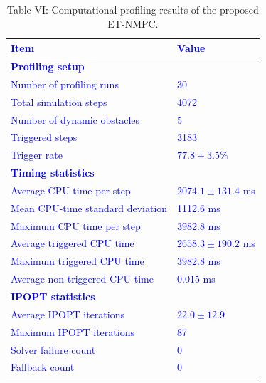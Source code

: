 \documentclass[12pt, twosides]{article}
\theoremstyle{definition}
\begin{document}
 \begin{table}[h]
 	\centering
 	\captionsetup{labelformat=empty}
 	\caption{Table VI: Computational profiling results of the proposed ET-NMPC.}
 	\label{tab:computational_profiling}
 	\scriptsize
 	\setlength{\tabcolsep}{2.5pt}
 	\renewcommand{\arraystretch}{1.12}
 	\begin{tabular}{p{}p{}}
 		\toprule
 		\textbf{\textcolor{blue}{Item}} & \textbf{\textcolor{blue}{Value}} \\
 		\midrule
 		\multicolumn{2}{l}{\textbf{\textcolor{blue}{Profiling setup}}} \\
 		\textcolor{blue}{Number of profiling runs} & \textcolor{blue}{30} \\
 		\textcolor{blue}{Total simulation steps} & \textcolor{blue}{4072} \\
 		\textcolor{blue}{Number of dynamic obstacles} & \textcolor{blue}{5} \\
 		\textcolor{blue}{Triggered steps} & \textcolor{blue}{3183} \\
 		\textcolor{blue}{Trigger rate} & \textcolor{blue}{$77.8 \pm 3.5\%$} \\
 		\midrule
 		\multicolumn{2}{l}{\textbf{\textcolor{blue}{Timing statistics}}} \\
 		\textcolor{blue}{Average CPU time per step} & \textcolor{blue}{$2074.1 \pm 131.4$ ms} \\
 		\textcolor{blue}{Mean CPU-time standard deviation} & \textcolor{blue}{1112.6 ms} \\
 		\textcolor{blue}{Maximum CPU time per step} & \textcolor{blue}{3982.8 ms} \\
 		\textcolor{blue}{Average triggered CPU time} & \textcolor{blue}{$2658.3 \pm 190.2$ ms} \\
 		\textcolor{blue}{Maximum triggered CPU time} & \textcolor{blue}{3982.8 ms} \\
 		\textcolor{blue}{Average non-triggered CPU time} & \textcolor{blue}{0.015 ms} \\
 		\midrule
 		\multicolumn{2}{l}{\textbf{\textcolor{blue}{IPOPT statistics}}} \\
 		\textcolor{blue}{Average IPOPT iterations} & \textcolor{blue}{$22.0 \pm 12.9$} \\
 		\textcolor{blue}{Maximum IPOPT iterations} & \textcolor{blue}{87} \\
 		\textcolor{blue}{Solver failure count} & \textcolor{blue}{0} \\
 		\textcolor{blue}{Fallback count} & \textcolor{blue}{0} \\

\end{tabular}
\end{table}
\end{document}
